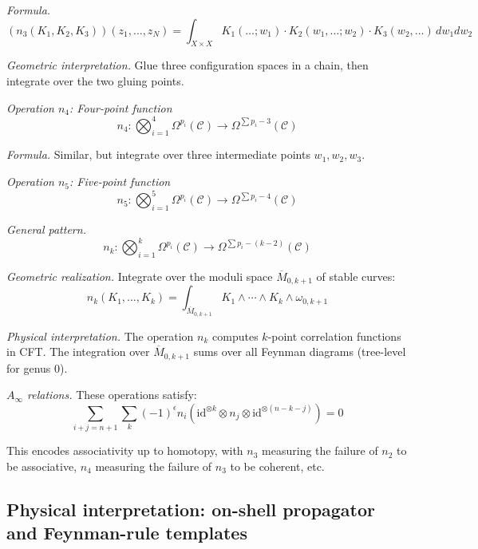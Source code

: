 \begin{example}
\emph{Formula.}
\[(n_3(K_1, K_2, K_3))(z_1, \ldots, z_N) = \int_{X \times X} K_1(\ldots; w_1) \cdot 
K_2(w_1, \ldots; w_2) \cdot K_3(w_2, \ldots) \, dw_1 dw_2\]

\emph{Geometric interpretation.} Glue three configuration spaces in a chain,
then integrate over the two gluing points.

\emph{Operation $n_4$: Four-point function}
\[n_4: \bigotimes_{i=1}^4 \Omega^{p_i}(\mathcal{C}) \to \Omega^{\sum p_i - 3}(\mathcal{C})\]

\emph{Formula.} Similar, but integrate over three intermediate points $w_1, w_2, w_3$.

\emph{Operation $n_5$: Five-point function}
\[n_5: \bigotimes_{i=1}^5 \Omega^{p_i}(\mathcal{C}) \to \Omega^{\sum p_i - 4}(\mathcal{C})\]

\emph{General pattern.}
\[n_k: \bigotimes_{i=1}^k \Omega^{p_i}(\mathcal{C}) \to \Omega^{\sum p_i - (k-2)}(\mathcal{C})\]

\emph{Geometric realization.} Integrate over the moduli space $\overline{M}_{0,k+1}$
of stable curves:
\[n_k(K_1, \ldots, K_k) = \int_{\overline{M}_{0,k+1}} K_1 \wedge \cdots \wedge K_k 
\wedge \omega_{0,k+1}\]

\emph{Physical interpretation.} The operation $n_k$ computes $k$-point correlation
functions in CFT. The integration over $\overline{M}_{0,k+1}$ sums over all Feynman
diagrams (tree-level for genus 0).

\emph{$A_\infty$ relations.} These operations satisfy:
\[\sum_{i+j=n+1} \sum_{k} (-1)^{\epsilon} n_i(\text{id}^{\otimes k} \otimes n_j 
\otimes \text{id}^{\otimes (n-k-j)}) = 0\]

This encodes associativity up to homotopy, with $n_3$ measuring the failure of 
$n_2$ to be associative, $n_4$ measuring the failure of $n_3$ to be coherent, etc.
\end{example}

\subsection{Physical interpretation: on-shell propagator and Feynman-rule templates}

